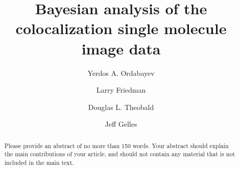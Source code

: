 \documentclass[9pt,lineno]{elife}
\title{Bayesian analysis of the colocalization single molecule image data}
\author[1*]{Yerdos A. Ordabayev}
\author[1,2\authfn{1}\authfn{3}]{Larry Friedman}
\author[2\authfn{1}\authfn{4}]{Douglas L. Theobald}
\author[2*]{Jeff Gelles}
\affil[1]{Brandeis University}
\affil[2]{Institution 2}
\begin{document}
\maketitle

\begin{abstract}
Please provide an abstract of no more than 150 words. Your abstract should explain the main contributions of your article, and should not contain any material that is not included in the main text.
\end{abstract}






%



%

%



%
\end{document}
